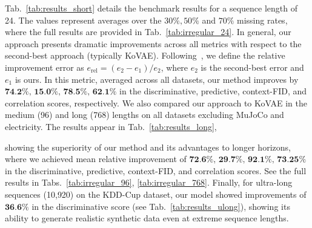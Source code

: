 \documentclass{article}
\theoremstyle{plain}
\theoremstyle{definition}
\theoremstyle{remark}
\begin{document}
Tab.~\ref{tab:results_short} details the benchmark results for a sequence length of 24. The values represent averages over the $30\%, 50\%$ and $70\%$ missing rates, where the full results are provided in Tab.~\ref{tab:irregular_24}. In general, our approach presents dramatic improvements across all metrics with respect to the second-best approach (typically KoVAE). Following~\cite{naiman2024generative}, we define the relative improvement error as $e_\text{rel} = (e_2-e_1)/e_2$, where $e_2$ is the second-best error and $e_1$ is ours. In this metric, averaged across all datasets, our method improves by $\textbf{74.2\%, 15.0\%, 78.5\%, 62.1\%}$ in the discriminative, predictive, context-FID, and correlation scores, respectively. We also compared our approach to KoVAE in the medium (96) and long (768) lengths on all datasets excluding MuJoCo and electricity. The results appear in Tab.~\ref{tab:results_long},

\begin{table} %
    \vspace{-3mm}
    \centering
    \caption{Discriminative results of ultra-long (10{,}920) sequences on KDD-Cup for different missing rates.}
    \label{tab:results_ulong}
    \vspace{-2mm}
\end{table}
showing the superiority of our method and its advantages to longer horizons, where we achieved mean relative improvement of $\textbf{72.6\%, 29.7\%, 92.1\%, 73.25\%}$ in the discriminative, predictive, context-FID, and correlation scores. See the full results in Tabs.~\ref{tab:irregular_96}, \ref{tab:irregular_768}. Finally, for ultra-long sequences (10{,}920) on the KDD-Cup dataset, our model showed improvements of $\textbf{36.6\%}$ in the discriminative score (see Tab.~\ref{tab:results_ulong}), showing its ability to generate realistic synthetic data even at extreme sequence lengths.
\end{document}

